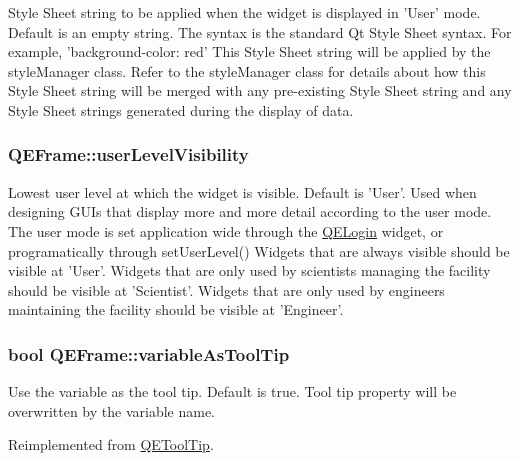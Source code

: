 \label{classQEFrame_a71f5eed86516183bed1d51189e954bdc}
Style Sheet string to be applied when the widget is displayed in 'User' mode. Default is an empty string. The syntax is the standard Qt Style Sheet syntax. For example, 'background-\/color: red' This Style Sheet string will be applied by the styleManager class. Refer to the styleManager class for details about how this Style Sheet string will be merged with any pre-\/existing Style Sheet string and any Style Sheet strings generated during the display of data. \hypertarget{classQEFrame_af6b93bbb318228dd8debf550d8e35bd0}{
\subsubsection[{userLevelVisibility}]{ QEFrame::userLevelVisibility}}
\label{classQEFrame_af6b93bbb318228dd8debf550d8e35bd0}
Lowest user level at which the widget is visible. Default is 'User'. Used when designing GUIs that display more and more detail according to the user mode. The user mode is set application wide through the \hyperlink{classQELogin}{QELogin} widget, or programatically through setUserLevel() Widgets that are always visible should be visible at 'User'. Widgets that are only used by scientists managing the facility should be visible at 'Scientist'. Widgets that are only used by engineers maintaining the facility should be visible at 'Engineer'. \hypertarget{classQEFrame_a1cb1946dc64c08ab7eb87c8214630a7c}{
\subsubsection[{variableAsToolTip}]{\setlength{\rightskip}{0pt plus 5cm}bool QEFrame::variableAsToolTip}}
\label{classQEFrame_a1cb1946dc64c08ab7eb87c8214630a7c}
Use the variable as the tool tip. Default is true. Tool tip property will be overwritten by the variable name. 

Reimplemented from \hyperlink{classQEToolTip}{QEToolTip}.

